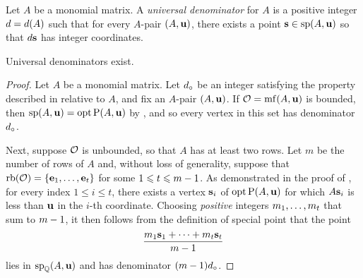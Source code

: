 \documentclass{amsart}
\begin{document}

\begin{definition}
   \label{universal denominator: D}
   Let $A$ be a monomial matrix.
   A \emph{universal denominator} for $A$ is a positive integer $d = d(A)$ such that for every $A$-pair $(A, \mathbf{u})$, there exists a point $\mathbf{s} \in \operatorname{sp}(A, \mathbf{u})$ so that $d \mathbf{s}$ has integer coordinates.
\end{definition}

\begin{theorem}
   \label{universal-denominators-exist:  T}
   Universal denominators exist.
\end{theorem}

\begin{proof}
   Let $A$ be a monomial matrix.
   Let $d_{\circ}$ be an integer satisfying the property described in  relative to $A$, and fix an $A$-pair $(A, \mathbf{u})$.
   If $\mathcal{O} = \operatorname{mf}(A, \mathbf{u})$ is bounded, then $\operatorname{sp}(A, \mathbf{u}) = \operatorname{opt} \mathrm{P}(A, \mathbf{u})$ by , and so every vertex in this set has denominator~$d_{\circ}$.

   Next, suppose $\mathcal{O}$ is unbounded, so that $A$ has at least two rows.
   Let $m$ be the number of rows of $A$ and, without loss of generality, suppose that $\operatorname{rb}(\mathcal{O}) = \{ \mathbf{e}_1, \ldots, \mathbf{e}_t \}$ for some $1 \leqslant t \leqslant m-1$.
   As demonstrated in the  proof of , for every index  $1 \leq i \leq t$, there exists a vertex $\mathbf{s}_i$ of $\operatorname{opt} \mathrm{P}(A, \mathbf{u})$ for which $A \mathbf{s}_i$ is less than $\mathbf{u}$ in the $i$-th coordinate.
   Choosing \emph{positive} integers $m_1, \ldots, m_t$ that sum to $m-1$, it then follows from the definition of special point that the point
   \[ \frac{ m_1 \mathbf{s}_1 + \cdots + m_t  \mathbf{s}_t}{m-1}  \]
   lies in $\operatorname{sp}_{\mathbb{Q}}(A, \mathbf{u})$ and has denominator $(m-1)d_{\circ}$.
\end{proof}
\end{document}
